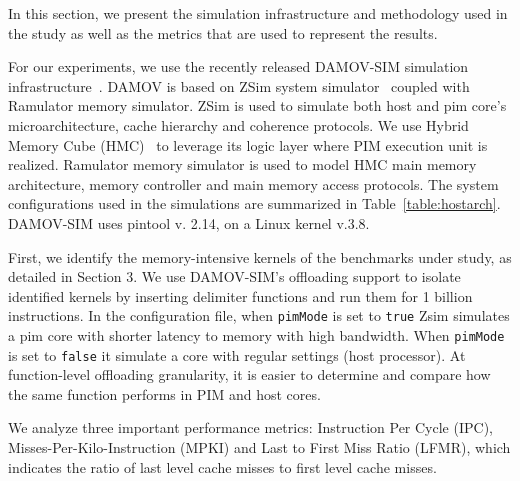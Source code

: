 

In this section, we present the simulation infrastructure and methodology used in the study as well as the metrics that are used to represent the results.  

For our experiments, we use the recently released DAMOV-SIM simulation infrastructure~\cite{71}. DAMOV is based on ZSim system simulator~\cite{zsim} coupled with Ramulator memory simulator\cite{ramulator}. ZSim is used to simulate both host and pim core's microarchitecture, cache hierarchy and coherence protocols. We use Hybrid Memory Cube (HMC)~\cite{hmc} to leverage its logic layer where PIM execution unit is realized. Ramulator memory simulator is used to model HMC main memory architecture, memory controller and main memory access protocols. The system configurations used in the simulations are summarized in Table~\ref{table:hostarch}. DAMOV-SIM uses pintool v. 2.14, on a Linux kernel v.3.8.  

First, we identify the memory-intensive kernels of the benchmarks under study, as detailed in Section 3. We use DAMOV-SIM's offloading support to isolate identified kernels by inserting delimiter functions and run them for 1 billion instructions. In the configuration file, when \texttt{pimMode} is set to \texttt{true} Zsim simulates a pim core with shorter latency to memory with high bandwidth. When \texttt{pimMode} is set to \texttt{false} it simulate a core with regular settings (host processor). At function-level offloading granularity, it is easier to determine and compare how the same function performs in PIM and host cores. %

We analyze three important performance metrics: Instruction Per Cycle (IPC), Misses-Per-Kilo-Instruction (MPKI) and Last to First Miss Ratio (LFMR), which indicates the ratio of last level cache misses to first level cache misses.    










